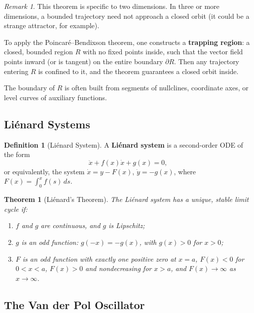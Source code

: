 \documentclass[11pt,letterpaper]{article}
\theoremstyle{definition}
\newtheorem{definition}{Definition}[section]
\theoremstyle{plain}
\newtheorem{theorem}{Theorem}[section]
\theoremstyle{remark}
\newtheorem{remark}{Remark}[section]
\begin{document}
\begin{remark}
This theorem is specific to two dimensions.  In three or more dimensions,
a bounded trajectory need not approach a closed orbit (it could be a
strange attractor, for example).
\end{remark}

\begin{physicalnote}
To apply the Poincar\'e--Bendixson theorem, one constructs a
\textbf{trapping region}: a closed, bounded region $R$ with no fixed points
inside, such that the vector field points inward (or is tangent) on the
entire boundary $\partial R$.  Then any trajectory entering $R$ is confined
to it, and the theorem guarantees a closed orbit inside.

The boundary of $R$ is often built from segments of nullclines, coordinate
axes, or level curves of auxiliary functions.
\end{physicalnote}

\subsection{Li\'enard Systems}\label{sec:lienard}

\begin{definition}[Li\'enard System]
A \textbf{Li\'enard system} is a second-order ODE of the form
\begin{equation}
  \ddot{x} + f(x)\dot{x} + g(x) = 0,
\end{equation}
or equivalently, the system $\dot{x} = y - F(x)$, $\dot{y} = -g(x)$,
where $F(x) = \int_0^x f(s)\,ds$.
\end{definition}

\begin{theorem}[Li\'enard's Theorem]
The Li\'enard system has a unique, stable limit cycle if:
\begin{enumerate}[leftmargin=2em]
\item $f$ and $g$ are continuous, and $g$ is Lipschitz;
\item $g$ is an odd function: $g(-x) = -g(x)$, with $g(x) > 0$ for $x > 0$;
\item $F$ is an odd function with exactly one positive zero at $x = a$,
      $F(x) < 0$ for $0 < x < a$, $F(x) > 0$ and nondecreasing for
      $x > a$, and $F(x) \to \infty$ as $x \to \infty$.
\end{enumerate}
\end{theorem}

\subsection{The Van der Pol Oscillator}\label{sec:vdp}
\end{document}
